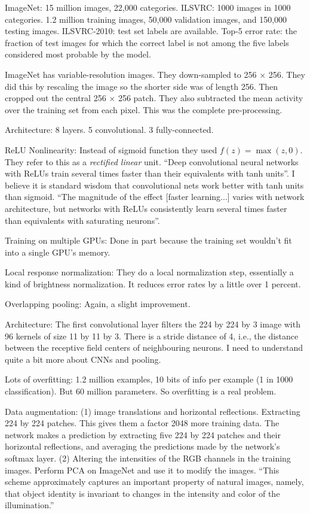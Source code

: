\documentclass[12pt]{report}
\begin{document}
ImageNet: 15 million images, 22,000 categories.  ILSVRC: 1000 images
in 1000 categories.  1.2 million training images, 50,000 validation
images, and 150,000 testing images.  ILSVRC-2010: test set labels are
available.  Top-5 error rate: the fraction of test images for which
the correct label is not among the five labels considered most
probable by the model.

ImageNet has variable-resolution images.  They down-sampled to 256
$\times$ 256.  They did this by rescaling the image so the shorter
side was of length 256.  Then cropped out the central 256 $\times$ 256
patch.  They also subtracted the mean activity over the training set
from each pixel.  This was the complete pre-processing.

Architecture: 8 layers.  5 convolutional.  3 fully-connected.

ReLU Nonlinearity: Instead of sigmoid function they used $f(z) =
\max(z, 0)$.  They refer to this as a \emph{rectified linear} unit.
``Deep convolutional neural networks with ReLUs train several times
faster than their equivalents with tanh units''.  I believe it is
standard wisdom that convolutional nets work better with tanh units
than sigmoid.  ``The magnitude of the effect [faster learning...]
varies with network architecture, but networks with ReLUs consistently
learn several times faster than equivalents with saturating neurons''.

Training on multiple GPUs: Done in part because the training set
wouldn't fit into a single GPU's memory.

Local response normalization: They do a local normalization step,
essentially a kind of brightness normalization.  It reduces error
rates by a little over 1 percent.

Overlapping pooling: Again, a slight improvement.

Architecture: The first convolutional layer filters the 224 by 224 by
3 image with 96 kernels of size 11 by 11 by 3.  There is a stride
distance of 4, i.e., the distance between the receptive field centers
of neighbouring neurons.  I need to understand quite a bit more about
CNNs and pooling.

Lots of overfitting: 1.2 million examples, 10 bits of info per example
(1 in 1000 classification).  But 60 million parameters.  So
overfitting is a real problem.

Data augmentation: (1) image translations and horizontal reflections.
Extracting 224 by 224 patches.  This gives them a factor 2048 more
training data.  The network makes a prediction by extracting five 224
by 224 patches and their horizontal reflections, and averaging the
predictions made by the network's softmax layer. (2) Altering the
intensities of the RGB channels in the training images.  Perform PCA
on ImageNet and use it to modify the images.  ``This scheme
approximately captures an important property of natural images,
namely, that object identity is invariant to changes in the intensity
and color of the illumination.'' 
\end{document}
